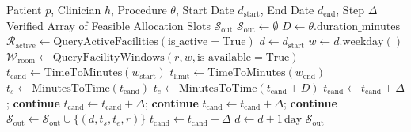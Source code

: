 \documentclass[conference]{IEEEtran}
\begin{document}
\begin{algorithm}[t]
\caption{Deterministic Multi-Resource Slot Discovery Engine}
\label{alg:scheduler}
\begin{algorithmic}[1]
\REQUIRE Patient $p$, Clinician $h$, Procedure $\theta$, Start Date $d_{\text{start}}$, End Date $d_{\text{end}}$, Step $\Delta$
\ENSURE Verified Array of Feasible Allocation Slots $\mathcal{S}_{\text{out}}$
\STATE $\mathcal{S}_{\text{out}} \leftarrow \emptyset$
\STATE $D \leftarrow \theta.\text{duration\_minutes}$
\STATE $\mathcal{R}_{\text{active}} \leftarrow \text{QueryActiveFacilities}(\text{is\_active} = \text{True})$
\STATE $d \leftarrow d_{\text{start}}$
    \STATE $w \leftarrow d.\text{weekday}()$
        \STATE $\mathcal{W}_{\text{room}} \leftarrow \text{QueryFacilityWindows}(r, w, \text{is\_available} = \text{True})$
            \STATE $t_{\text{cand}} \leftarrow \text{TimeToMinutes}(w_{\text{start}})$
            \STATE $t_{\text{limit}} \leftarrow \text{TimeToMinutes}(w_{\text{end}})$
                \STATE $t_s \leftarrow \text{MinutesToTime}(t_{\text{cand}})$
                \STATE $t_e \leftarrow \text{MinutesToTime}(t_{\text{cand}} + D)$
                    \STATE $t_{\text{cand}} \leftarrow t_{\text{cand}} + \Delta$; \textbf{continue}
                \ENDIF
                    \STATE $t_{\text{cand}} \leftarrow t_{\text{cand}} + \Delta$; \textbf{continue}
                \ENDIF
                    \STATE $t_{\text{cand}} \leftarrow t_{\text{cand}} + \Delta$; \textbf{continue}
                \ENDIF
                \STATE $\mathcal{S}_{\text{out}} \leftarrow \mathcal{S}_{\text{out}} \cup \{(d, t_s, t_e, r)\}$
                \STATE $t_{\text{cand}} \leftarrow t_{\text{cand}} + \Delta$
            \ENDWHILE
        \ENDFOR
    \ENDFOR
    \STATE $d \leftarrow d + 1\,\text{day}$
\ENDWHILE
\RETURN $\mathcal{S}_{\text{out}}$
\end{algorithmic}
\end{algorithm}
\end{document}
